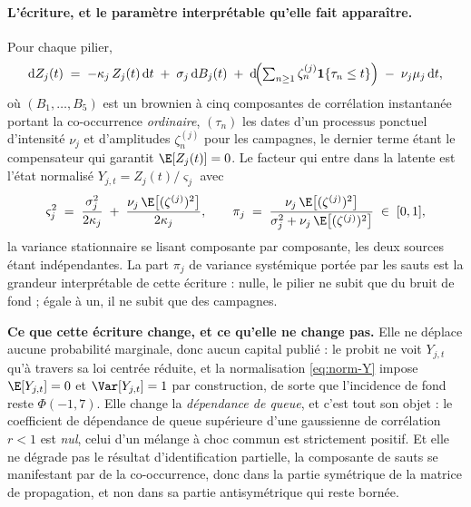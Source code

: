 \paragraph{L'écriture, et le paramètre interprétable qu'elle fait apparaître.}
Pour chaque pilier,
\begin{equation}
  \mathrm{d}Z_j(t) \;=\; -\kappa_j\,Z_j(t)\,\mathrm{d}t \;+\; \sigma_j\,\mathrm{d}B_j(t)
  \;+\; \mathrm{d}\!\Bigl(\textstyle\sum_{n\ge 1}\zeta^{(j)}_n\mathbf 1\{\tau_n\le t\}\Bigr)
  \;-\; \nu_j\mu_j\,\mathrm{d}t,
  \label{eq:sde-Y}
\end{equation}
où $(B_1,\dots,B_5)$ est un brownien à cinq composantes de corrélation instantanée portant la
co-occurrence \emph{ordinaire}, $(\tau_n)$ les dates d'un processus ponctuel d'intensité $\nu_j$
et d'amplitudes $\zeta^{(j)}_n$ pour les campagnes, le dernier terme étant le compensateur qui
garantit $\E[Z_j(t)]=0$. Le facteur qui entre dans la latente est l'état normalisé
$Y_{j,t}=Z_j(t)/\varsigma_j$ avec
\begin{equation}
  \varsigma_j^2 \;=\; \frac{\sigma_j^2}{2\kappa_j} \;+\;
  \frac{\nu_j\,\E\bigl[(\zeta^{(j)})^2\bigr]}{2\kappa_j},
  \qquad
  \pi_j \;=\; \frac{\nu_j\,\E\bigl[(\zeta^{(j)})^2\bigr]}
                   {\sigma_j^2+\nu_j\,\E\bigl[(\zeta^{(j)})^2\bigr]} \;\in\; [0,1],
  \label{eq:norm-Y}
\end{equation}
la variance stationnaire se lisant composante par composante, les deux sources étant
indépendantes. La part $\pi_j$ de variance systémique portée par les sauts est la grandeur
interprétable de cette écriture : nulle, le pilier ne subit que du bruit de fond ; égale à un,
il ne subit que des campagnes.

\begin{cle}
\textbf{Ce que cette écriture change, et ce qu'elle ne change pas.} Elle ne déplace
aucune probabilité marginale, donc aucun capital publié : le probit ne voit
$Y_{j,t}$ qu'à travers sa loi centrée réduite, et la normalisation \eqref{eq:norm-Y} impose
$\E[Y_{j,t}]=0$ et $\Var[Y_{j,t}]=1$ par construction, de sorte que l'incidence de fond reste
$\Phi(-1{,}7)$. Elle change la \emph{dépendance de queue}, et c'est tout son objet : le
coefficient de dépendance de queue supérieure d'une gaussienne de corrélation $r<1$ est
\emph{nul}, celui d'un mélange à choc commun est strictement positif. Et elle ne dégrade pas le
résultat d'identification partielle, la composante de sauts se manifestant par de la
co-occurrence, donc dans la partie symétrique de la matrice de propagation, et non dans sa
partie antisymétrique qui reste bornée.
\end{cle}


